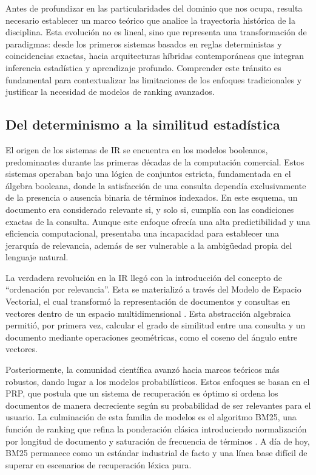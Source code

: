 Antes de profundizar en las particularidades del dominio que nos ocupa, resulta necesario establecer un marco teórico que analice la trayectoria histórica de la disciplina. Esta evolución no es lineal, sino que representa una transformación de paradigmas: desde los primeros sistemas basados en reglas deterministas y coincidencias exactas, hacia arquitecturas híbridas contemporáneas que integran inferencia estadística y aprendizaje profundo. Comprender este tránsito es fundamental para contextualizar las limitaciones de los enfoques tradicionales y justificar la necesidad de modelos de ranking avanzados.

\subsection{Del determinismo a la similitud estadística}

\noindent El origen de los sistemas de \gls{IR} se encuentra en los modelos booleanos, predominantes durante las primeras décadas de la computación comercial. Estos sistemas operaban bajo una lógica de conjuntos estricta, fundamentada en el álgebra booleana, donde la satisfacción de una consulta dependía exclusivamente de la presencia o ausencia binaria de términos indexados. En este esquema, un documento era considerado relevante si, y solo si, cumplía con las condiciones exactas de la consulta. Aunque este enfoque ofrecía una alta predictibilidad y una eficiencia computacional, presentaba una incapacidad para establecer una jerarquía de relevancia, además de ser vulnerable a la ambigüedad propia del lenguaje natural.

La verdadera revolución en la \gls{IR} llegó con la introducción del concepto de ``ordenación por relevancia''. Esta se materializó a través del Modelo de Espacio Vectorial, el cual transformó la representación de documentos y consultas en vectores dentro de un espacio multidimensional \cite{salton1975vector}. Esta abstracción algebraica permitió, por primera vez, calcular el grado de similitud entre una consulta y un documento mediante operaciones geométricas, como el coseno del ángulo entre vectores. 

Posteriormente, la comunidad científica avanzó hacia marcos teóricos más robustos, dando lugar a los modelos probabilísticos. Estos enfoques se basan en el \gls{PRP}, que postula que un sistema de recuperación es óptimo si ordena los documentos de manera decreciente según su probabilidad de ser relevantes para el usuario. La culminación de esta familia de modelos es el algoritmo \gls{BM25}, una función de ranking que refina la ponderación clásica introduciendo normalización por longitud de documento y saturación de frecuencia de términos \cite{robertson2009probabilistic}. A día de hoy, \gls{BM25} permanece como un estándar industrial de facto y una línea base difícil de superar en escenarios de recuperación léxica pura.

